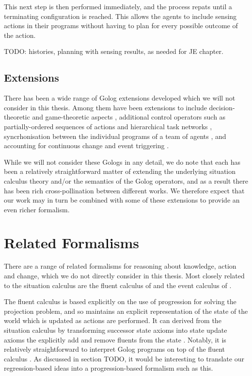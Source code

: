 This next step is then performed immediately, and the process repats
until a terminating configuration is reached. This allows the agents
to include sensing actions in their programs without having to plan
for every possible outcome of the action.

TODO: histories, planning with sensing results, as needed for JE chapter.


\subsection{Extensions}

There has been a wide range of Golog extensions developed which we
will not consider in this thesis. Among them have been extensions
to include decision-theoretic \citep{boutilier00dtgolog} and game-theoretic
aspects \citep{finzi03gtgolog,finzi05pogtgolog}, additional control
operators such as partially-ordered sequences of actions \citep{son00htn_golog}
and hierarchical task networks \citep{Gabaldon02htn_in_golog,Son04golog+htn+time},
syncrhonisation between the individual programs of a team of agents
\citep{farinelli07team_golog}, and accounting for continuous change
and event triggering \citep{grosskreutz00ccgolog}.

While we will not consider these Gologs in any detail, we do note
that each has been a relatively straightforward matter of extending
the underlying situation calculus theory and/or the semantics of the
Golog operators, and as a result there has been rich cross-pollination
between different works. We therefore expect that our work may in
turn be combined with some of these extensions to provide an even
richer formalism.


\section{Related Formalisms}

There are a range of related formalisms for reasoning about knowledge,
action and change, which we do not directly consider in this thesis.
Most closely related to the situation calculus are the fluent calculus
of \citet{thielscher98fluent_calculus} and the event calculus of
\citet{kowalski86event_calculus}.

The fluent calculus is based explicitly on the use of progression
for solving the projection problem, and so maintains an explicit representation
of the state of the world which is updated as actions are performed.
It can derived from the situation calculus by transforming successor
state axioms into state update axioms the explicitly add and remove
fluents from the state \citep{thielscher99fluentcalc_from_sitcalc}.
Notably, it is relatively straightforward to interpret Golog programs
on top of the fluent calculus \citep{thielscher05golog_in_flux}.
As discussed in section TODO, it would be interesting to translate
our regression-based ideas into a progression-based formalism such
as this.

